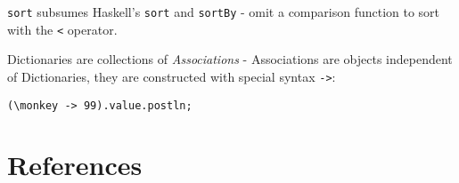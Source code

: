 \documentclass{article}
\begin{document}
\texttt{sort} subsumes Haskell's \texttt{sort} and 
\texttt{sortBy} - omit a comparison function to sort with the 
\texttt{<} operator.

Dictionaries are collections of \emph{Associations} - Associations 
are objects independent of Dictionaries, they are constructed with
special syntax \texttt{->}:

\begin{verbatim}
(\monkey -> 99).value.postln;
\end{verbatim}


\section{References}
\end{document}
